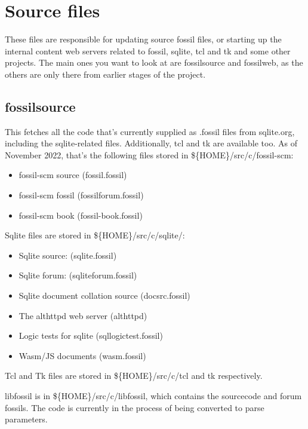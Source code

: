 \documentclass[11pt]{article}
\begin{document}
\setcounter{tocdepth}{2}
\tableofcontents

\newpage

\section*{Source files}
\label{sec:org8f543bd}

These files are responsible for updating source fossil files, or starting up the internal content
web servers related to fossil, sqlite, tcl and tk and some other projects. The main ones you want to
look at are fossilsource and fossilweb, as the others are only there from earlier stages of the
project.


\subsection*{fossilsource}
\label{sec:orgb5d8fe1}

This fetches all the code that's currently supplied as .fossil files from sqlite.org, including the
sqlite-related files. Additionally, tcl and tk are available too. As of November 2022, that's the
following files stored in \$\{HOME\}/src/c/fossil-scm:
\begin{itemize}
\item fossil-scm source (fossil.fossil)
\item fossil-scm fossil (fossilforum.fossil)
\item fossil-scm book (fossil-book.fossil)
\end{itemize}

Sqlite files are stored in \$\{HOME\}/src/c/sqlite/:
\begin{itemize}
\item Sqlite source: (sqlite.fossil)
\item Sqlite forum: (sqliteforum.fossil)
\item Sqlite document collation source (docsrc.fossil)
\item The althttpd web server (althttpd)
\item Logic tests for sqlite (sqllogictest.fossil)
\item Wasm/JS documents (wasm.fossil)
\end{itemize}

Tcl and Tk files are stored in \$\{HOME\}/src/c/tcl and tk respectively.

libfossil is in \$\{HOME\}/src/c/libfossil, which contains the sourcecode and forum fossils.  The code
is currently in the process of being converted to parse parameters.
\end{document}
